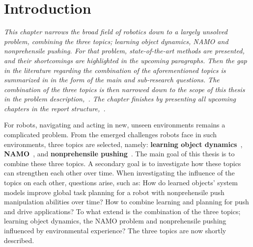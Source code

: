 \chapter{Introduction}%
\label{chap:introduction}
\textit{This chapter narrows the broad field of robotics down to a largely unsolved problem, combining the three topics; learning object dynamics, \ac{NAMO} and nonprehensile pushing. For that problem, state-of-the-art methods are presented, and their shortcomings are highlighted in the upcoming paragraphs. Then the gap in the literature regarding the combination of the aforementioned topics is summarized in  in the form of the main and sub-research questions. The combination of the three topics is then narrowed down to the scope of this thesis in the problem description,~. The chapter finishes by presenting all upcoming chapters in the report structure,~.\bs}

For robots, navigating and acting in new, unseen environments remains a complicated problem. From the emerged challenges robots face in such environments, three topics are selected, namely: \textbf{learning object dynamics}~\cite{geist_structured_2021}, \textbf{\acf{NAMO}}~\cite{stilman_planning_2007}, and \textbf{nonprehensile pushing}~\cite{stuber_let_2020}. The main goal of this thesis is to combine these three topics. A secondary goal is to investigate how these topics can strengthen each other over time. When investigating the influence of the topics on each other, questions arise, such as: How do learned objects' system models improve global task planning for a robot with nonprehensile push manipulation abilities over time? How to combine learning and planning for push and drive applications? To what extend is the combination of the three topics; learning object dynamics, the \ac{NAMO} problem and nonprehensile pushing influenced by environmental experience? The three topics are now shortly described.\bs


